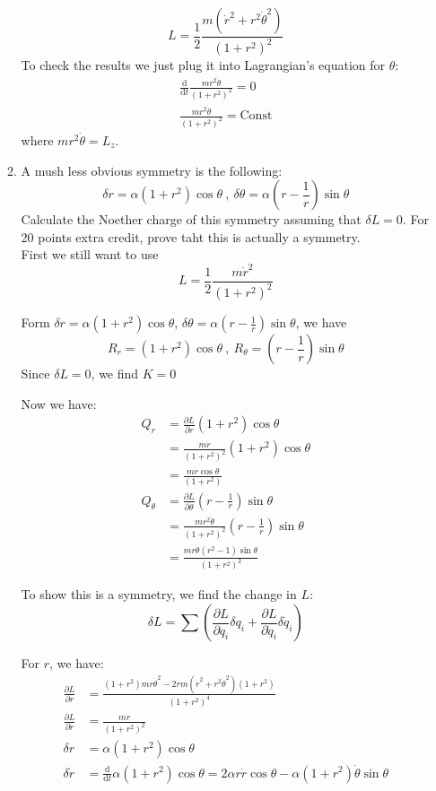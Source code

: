 \documentclass{article}
\newcommand{\de}{\mathrm{d}}
\begin{document}
\begin{enumerate}
\begin{enumerate}
        \[
        L = \frac{1}{2}\frac{m(\dot r ^2 + r^2\dot \theta^2)}{(1+ r^2)^2}
        \]
        To check the results we just plug it into Lagrangian's equation for $\theta$:
        \begin{align*}
            \frac{\de}{\de t} \frac{mr^2\dot \theta}{(1+r^2)^2} = 0 \\
            \frac{mr^2\dot \theta}{(1+r^2)^2} = \text{Const}
        \end{align*}
        where $mr^2\dot \theta = L_z$.

        \item A mush less obvious symmetry is the following:
        \[
        \delta r = \alpha(1+r^2)\cos\theta\ ,\ \delta\theta = \alpha(r - \frac{1}{r})\sin\theta
        \]
        Calculate the Noether charge of this symmetry assuming that $\delta L = 0$. For 20 points extra credit, prove taht this is actually a symmetry.\\

        First we still want to use
        \[
        L = \frac{1}{2}\frac{m\dot r ^2}{(1+ r^2)^2}
        \]

        Form $\delta r = \alpha(1+r^2)\cos\theta$, $\delta\theta = \alpha(r - \frac{1}{r})\sin\theta$, we have
        \[
        R_r = (1+r^2)\cos\theta \ ,\ R_\theta = (r - \frac{1}{r})\sin\theta
        \]
        Since $\delta L = 0$, we find $K = 0$

        Now we have:
        \begin{align*}
            Q_r &= \frac{\partial L}{\partial \dot r} (1+r^2)\cos\theta \\
                &= \frac{m\dot r}{(1+r^2)^2} (1+r^2)\cos\theta\\
                &= \frac{m\dot r \cos\theta}{(1+r^2)}\\
            Q_\theta &= \frac{\partial L}{\partial \dot \theta}(r - \frac{1}{r})\sin\theta \\
                     &= \frac{mr^2\dot\theta}{(1+r^2)^2}(r - \frac{1}{r})\sin\theta \\
                     &= \frac{mr\dot\theta(r^2 - 1)\sin\theta}{(1+r^2)^2}
        \end{align*}

        To show this is a symmetry, we find the change in $L$:
        \[
        \delta L = \sum (\frac{\partial L}{\partial q_i}\delta q_i + \frac{\partial L}{\partial \dot q_i}\delta \dot q_i)
        \]

        For $r$, we have:
        \begin{align*}
            \frac{\partial L}{\partial r} &= \frac{(1+r^2)mr\dot\theta^2 - 2r m(\dot r^2 + r^2\dot\theta^2)(1+r^2)}{(1+r^2)^4} \\
            \frac{\partial L}{\partial \dot r} &= \frac{m\dot r}{(1+r^2)^2}\\
            \delta r &= \alpha(1+r^2)\cos\theta\\
            \delta \dot r &= \frac{\de}{\de t} \alpha(1+r^2)\cos\theta = 2\alpha r\dot r \cos\theta - \alpha (1+r^2)\dot\theta \sin\theta
        \end{align*}


\end{enumerate}
\end{enumerate}
\end{document}
